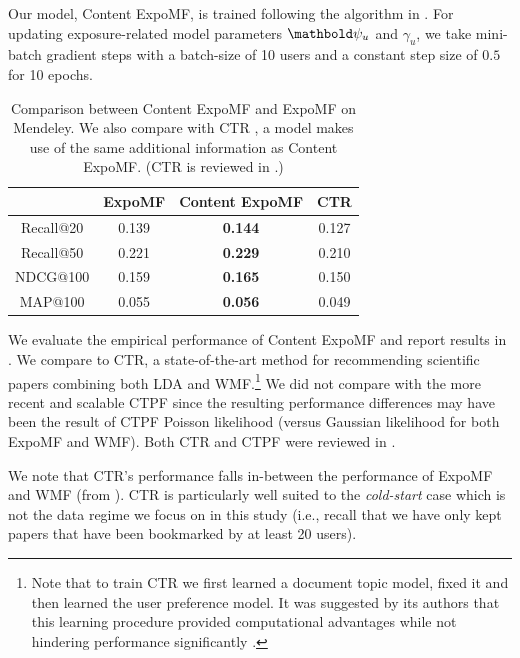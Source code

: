Our model, Content ExpoMF, is trained following the algorithm in
. For updating exposure-related model parameters
$\mb\psi_{u}$ and $\gamma_u$, we take mini-batch gradient steps with a
batch-size of 10 users and a constant step size of $0.5$ for 10 epochs.

\begin{table}
\centering
\begin{tabular}{ c c c c}
\toprule
            & ExpoMF & Content ExpoMF & \gls{CTR} \citep{wang2011collaborative} \\ \midrule
  Recall@20 & 0.139 & \textbf{0.144}         & 0.127 \\ 
  Recall@50 & 0.221 & \textbf{0.229}         & 0.210 \\ 
  NDCG@100  & 0.159 & \textbf{0.165}         & 0.150 \\ 
  MAP@100   & 0.055 & \textbf{0.056}        & 0.049 \\ 
\bottomrule 
\end{tabular}
\caption{Comparison between Content ExpoMF and ExpoMF on Mendeley. We also compare with \gls{CTR} \citep{wang2011collaborative}, a model makes use of the same additional information as Content ExpoMF. (\gls{CTR} is reviewed in .)}
\label{chpt:expomf:tab:si_doc_results}
\end{table}

 We evaluate the empirical performance of Content ExpoMF and report results
in . We compare to \gls{CTR}, a state-of-the-art method for recommending scientific
papers \citep{wang2011collaborative} combining both \gls{LDA} and \gls{WMF}.\footnote{Note that to train \gls{CTR}
we first learned a document topic model, fixed it and then learned the
user preference model. It was suggested by its authors
that this learning procedure provided computational advantages while not hindering performance significantly \citep{wang2011collaborative}.}
We did not compare with the more recent and scalable \gls{CTPF} \citep{gopalan2014content} since the resulting
performance differences may have been the result of \gls{CTPF} Poisson
likelihood (versus Gaussian likelihood for both ExpoMF and \gls{WMF}). Both \gls{CTR} and \gls{CTPF} were reviewed in .

We note that \gls{CTR}'s performance falls in-between the performance of ExpoMF
and \gls{WMF} (from ). \gls{CTR} is particularly well suited to the
\emph{cold-start} case which is not the data regime we focus on in this
study (i.e., recall that we have only kept papers that have been
bookmarked by at least 20 users).

